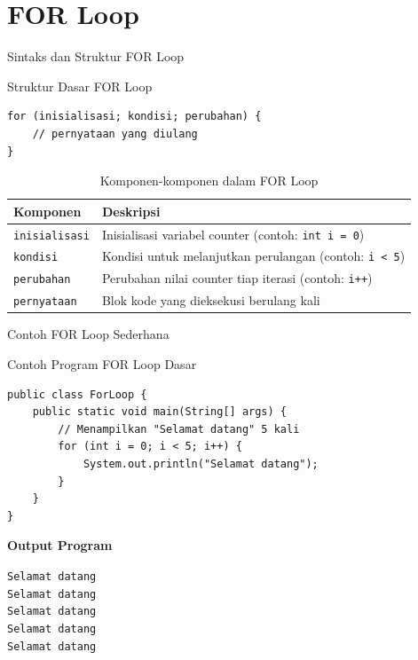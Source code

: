 \documentclass{beamer}
\begin{document}
\section{FOR Loop}
\begin{frame}[fragile]{Sintaks dan Struktur FOR Loop}
  \begin{block}{Struktur Dasar FOR Loop}
    \begin{lstlisting}
for (inisialisasi; kondisi; perubahan) {
    // pernyataan yang diulang
}
    \end{lstlisting}
  \end{block}
  
  \begin{table}
    \footnotesize
    \begin{tabular}{p{}|p{}}
    \textbf{Komponen} & \textbf{Deskripsi} \\
    \hline
    \rowcolor{lightgray}
    \texttt{inisialisasi} & Inisialisasi variabel counter (contoh: \texttt{int i = 0}) \\
    \rowcolor{white}
    \texttt{kondisi} & Kondisi untuk melanjutkan perulangan (contoh: \texttt{i < 5}) \\
    \rowcolor{lightgray}
    \texttt{perubahan} & Perubahan nilai counter tiap iterasi (contoh: \texttt{i++}) \\
    \rowcolor{white}
    \texttt{pernyataan} & Blok kode yang dieksekusi berulang kali \\
    \end{tabular}
    \caption{Komponen-komponen dalam FOR Loop}
  \end{table}
\end{frame}

\begin{frame}[fragile]{Contoh FOR Loop Sederhana}
  \begin{exampleblock}{Contoh Program FOR Loop Dasar}
    \begin{lstlisting}
public class ForLoop {
    public static void main(String[] args) {
        // Menampilkan "Selamat datang" 5 kali
        for (int i = 0; i < 5; i++) {
            System.out.println("Selamat datang");
        }
    }
}
    \end{lstlisting}
  \end{exampleblock}
  
  \vspace{-0.5cm} 
  
  \textbf{Output Program}
    \colorbox{gray!20}{
      \parbox{0.9\textwidth}{
        {\footnotesize
        \texttt{Selamat datang\\
        Selamat datang\\
        Selamat datang\\
        Selamat datang\\
        Selamat datang}
        }
      }
    }
\end{frame}
\end{document}
